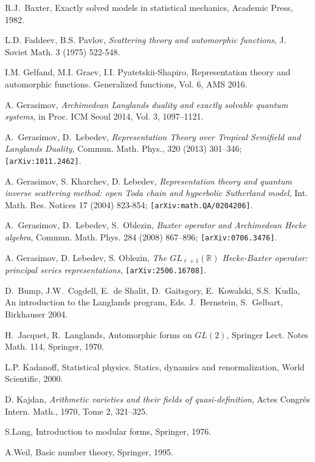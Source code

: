 \documentclass[12pt]{article}
\begin{document}
\begin{thebibliography}{15}
  R.J.~Baxter, Exactly solved models in statistical mechanics,
Academic Press, 1982.


 L.D. Faddeev, B.S. Pavlov,
{\it Scattering theory and automorphic functions}, J. Soviet Math. 3 (1975) 522-548.


 I.M. Gelfand, M.I. Graev, I.I. Pyatetskii-Shapiro,
Representation theory and automorphic functions. Generalized functions,
Vol. 6, AMS 2016.


 A. Gerasimov, {\it Archimedean Langlands duality
and exactly solvable quantum systems}, in Proc. ICM Seoul 2014, Vol.
3, 1097--1121.

 A.~Gerasimov, D.~Lebedev,
  {\it Representation Theory over Tropical Semifield and Langlands
    Duality},   Commun. Math. Phys., 320 (2013) 301--346;
{\tt[arXiv:1011.2462]}.


 A. Gerasimov, S. Kharchev, D. Lebedev,
{\it Representation theory and quantum inverse scattering method:
open Toda chain and hyperbolic Sutherland model}, Int. Math. Res.
Notices 17 (2004) 823-854; {\tt[arXiv:math.QA/0204206]}.


 A.~Gerasimov, D.~Lebedev, S.~Oblezin, {\it Baxter operator
and Archimedean Hecke algebra}, Commun. Math. Phys. 284 (2008)
867--896; {\tt [arXiv:0706.3476]}.



 A. Gerasimov, D. Lebedev, S. Oblezin,
  {\it The $GL_{\ell+1}(\mathbb{R})$ Hecke-Baxter operator: principal
    series     representations}, {\tt[arXiv:2506.16708]}.


 D.~Bump, J.W.~Cogdell, E.~de Shalit,
D.~Gaitsgory, E.~Kowalski, S.S.~Kudla, An introduction to the
Langlands program, Eds. J.~Bernstein, S.~Gelbart, Birkhauser 2004.


 H.~Jacquet, R.~Langlands,
 Automorphic forms on $GL(2)$, Springer Lect. Notes Math. 114,
Springer, 1970.

 L.P. Kadanoff, Statistical physics. Statics,
    dynamics and renormalization, World Scientific, 2000.

 D. Kajdan, {\it Arithmetic varieties and their
fields of quasi-definition}, Actes Congr\'{e}s Intern. Math., 1970,
Tome 2, 321--325.


 S.Lang, Introduction to modular forms, Springer, 1976.

 A.Weil, Basic number theory, Springer, 1995.



\end{thebibliography}
\end{document}
